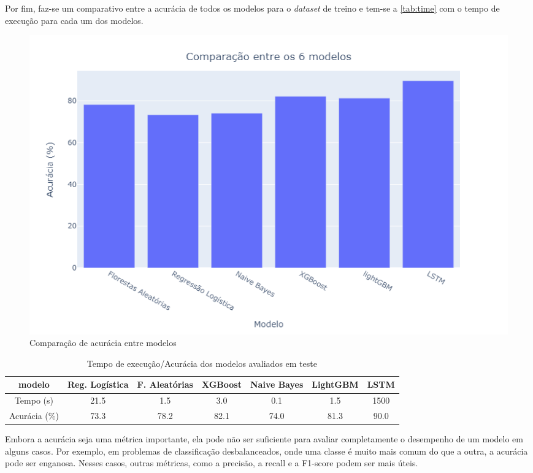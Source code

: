 Por fim, faz-se um comparativo entre a acurácia de todos os modelos para o \textit{dataset} de treino e tem-se a \autoref{tab:time} com o tempo de execução para cada um dos modelos.

\begin{figure}[H]
    \centering
    \includegraphics[scale=0.55]{./figs/comparative.png}
    \caption{Comparação de acurácia entre modelos}
    \label{fig:comparative}
\end{figure}

\begin{table}[H]
    \centering
    \small
    \begin{tabular}{c|cccccc}
        \hline
        { modelo}        & { Reg. Logística} & { F. Aleatórias} & { XGBoost} & { Naive Bayes} & LightGBM & LSTM \\ \hline \hline
        { Tempo (s)}     & { 21.5}           & { 1.5}           & { 3.0}     & { 0.1}         & {1.5}    & 1500 \\ \hline
        { Acurácia (\%)} & { 73.3}           & { 78.2}          & { 82.1}    & { 74.0}        & 81.3     & 90.0 \\
    \end{tabular}
    \caption{Tempo de execução/Acurácia dos modelos avaliados em teste}
    \label{tab:time}
\end{table}

Embora a acurácia seja uma métrica importante, ela pode não ser suficiente para avaliar completamente o desempenho de um modelo em alguns casos. Por exemplo, em problemas de classificação desbalanceados, onde uma classe é muito mais comum do que a outra, a acurácia pode ser enganosa. Nesses casos, outras métricas, como a precisão, a recall e a F1-score podem ser mais úteis.

